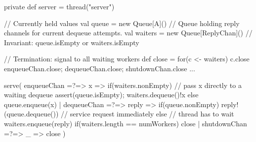 
\begin{slide}

\begin{scala}
  private def server = thread("server"){
    // Currently held values
    val queue = new Queue[A]()
    // Queue holding reply channels for current dequeue attempts.
    val waiters = new Queue[ReplyChan]()
    // Invariant: queue.isEmpty or waiters.isEmpty

    // Termination: signal to all waiting workers
    def close = {
      for(c <- waiters) c.close
      enqueueChan.close; dequeueChan.close; shutdownChan.close
    }
    ...
  }
\end{scala}
\end{slide}


\begin{slide}

\begin{scala}
    serve(
      enqueueChan =?=> { x => 
        if(waiters.nonEmpty){ // pass x directly to a waiting dequeue
          assert(queue.isEmpty); waiters.dequeue()!x
        }
        else queue.enqueue(x)
      }
      | dequeueChan =?=> { reply =>
          if(queue.nonEmpty) reply!(queue.dequeue()) // service request immediately
          else{                                        // thread has to wait
            waiters.enqueue(reply)
            if(waiters.length == numWorkers) close
          }
        }
      | shutdownChan =?=> { _ => close }
    )
\end{scala}
\end{slide}
